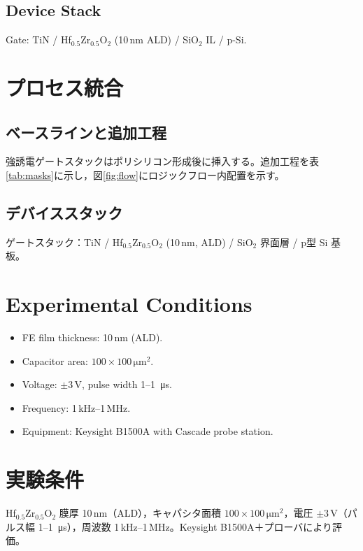 \documentclass[journal]{IEEEtran}
\begin{document}
\subsection*{Device Stack}
Gate: TiN / Hf$_{0.5}$Zr$_{0.5}$O$_2$ (10\,nm ALD) / SiO$_2$ IL / p-Si.

\section*{プロセス統合}
\subsection*{ベースラインと追加工程}
強誘電ゲートスタックはポリシリコン形成後に挿入する。追加工程を表\ref{tab:masks}に示し，図\ref{fig:flow}にロジックフロー内配置を示す。

\subsection*{デバイススタック}
ゲートスタック：TiN / Hf$_{0.5}$Zr$_{0.5}$O$_2$ (10\,nm, ALD) / SiO$_2$ 界面層 / p型 Si 基板。

\section{Experimental Conditions}
\begin{itemize}
  \item FE film thickness: 10\,nm (ALD).
  \item Capacitor area: $100\times100\,\si{\micro\meter}^2$.
  \item Voltage: $\pm 3$\,V, pulse width 1--\SI{1}{\micro\second}.
  \item Frequency: 1\,kHz--1\,MHz.
  \item Equipment: Keysight B1500A with Cascade probe station.
\end{itemize}

\section*{実験条件}
Hf$_{0.5}$Zr$_{0.5}$O$_2$ 膜厚 10\,nm（ALD），キャパシタ面積 $100\times100\,\si{\micro\meter}^2$，電圧 $\pm 3$\,V（パルス幅 1--\SI{1}{\micro\second}），周波数 1\,kHz--1\,MHz。Keysight B1500A＋プローバにより評価。

\end{document}
